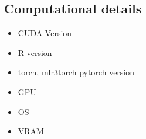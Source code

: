 \documentclass[article]{jss}
\theoremstyle{definition}
\begin{document}


\begin{appendix}

\section{Computational details}\label{app:comp-details}

\begin{itemize}
    \item CUDA Version
    \item R version
    \item torch, mlr3torch pytorch version
    \item GPU
    \item OS
    \item VRAM
\end{itemize}

\end{appendix}
\end{document}
